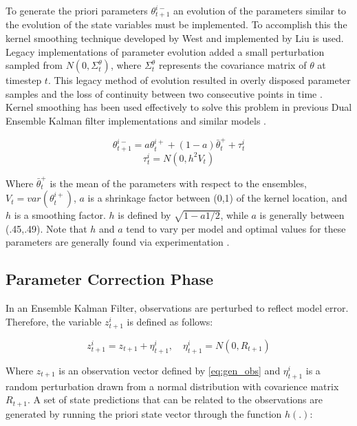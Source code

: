 To generate the priori parameters $\theta^{i-}_{t+1}$ an evolution of the parameters similar to the evolution of the state variables must be implemented. To accomplish this the kernel smoothing technique developed by West\cite{West1993} and implemented by Liu \cite{Liu2000} is used. Legacy implementations of parameter evolution added a small perturbation sampled from $N(0,\Sigma^{\theta}_{t})$, where $\Sigma^{\theta}_{t}$ represents the covariance matrix of $\theta$ at timestep $t$. This legacy method of evolution resulted in overly disposed parameter samples and the loss of continuity between two consecutive points in time \cite{Liu2000} \cite{Chen2008}. Kernel smoothing has been used effectively to solve this problem in previous Dual Ensemble Kalman filter implementations \cite{Moradkhani2005} and similar models \cite{Chen2008}.

\begin{equation}\label{eq:dekf_thetaminus}
\theta_{t+1}^{i-} = a\theta_{t}^{i+} + (1-a)\bar{\theta}_{t}^{+} + \tau_{t}^{i}
\end{equation}
\begin{equation}\label{eq:dekf_tau}
\tau_{t}^{i} = N(0, h^{2}V_{t})
\end{equation}
 
Where $\bar{\theta}_{t}^{+}$ is the mean of the parameters with respect to the ensembles, $V_{t} = var(\theta_{t}^{i+})$, $a$ is a shrinkage factor between (0,1) of the kernel location, and $h$ is a smoothing factor. $h$ is defined by $\sqrt{1-a1/2}$, while $a$ is generally between (.45,.49). Note that $h$ and $a$ tend to vary per model and optimal values for these parameters are generally found via experimentation  \cite{Moradkhani2005}  \cite{Anderson1999} \cite{Annan2005} \cite{Chen2008}.

\subsection{Parameter Correction Phase}

In an Ensemble Kalman Filter, observations are perturbed to reflect model error. Therefore, the variable $z_{t+1}^{i}$ is defined as follows:

\begin{equation}\label{eq:dekf_obs}
z_{t+1}^{i} = z_{t+1} + \eta_{t+1}^{i},\quad \eta_{t+1}^{i} = N(0,R_{t+1})
\end{equation}

Where $z_{t+1}$ is an observation vector defined by \eqref{eq:gen_obs} and $\eta_{t+1}^{i}$ is a random perturbation drawn from a normal distribution with covarience matrix $R_{t+1}$. A set of state predictions that can be related to the observations are generated by running the priori state vector through the function $h(.)$:

